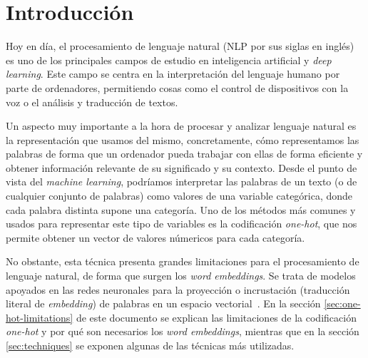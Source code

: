 \section{Introducción}

Hoy en día, el procesamiento de lenguaje natural (NLP por sus siglas en inglés)
es uno de los principales campos de estudio en inteligencia artificial y
\textit{deep learning}. Este campo se centra en la interpretación del lenguaje
humano por parte de ordenadores, permitiendo cosas como el control de
dispositivos con la voz o el análisis y traducción de textos.

Un aspecto muy importante a la hora de procesar y analizar lenguaje natural es
la representación que usamos del mismo, concretamente, cómo representamos las
palabras de forma que un ordenador pueda trabajar con ellas de forma eficiente y
obtener información relevante de su significado y su contexto. Desde el punto de
vista del \textit{machine learning}, podríamos interpretar las palabras de un
texto (o de cualquier conjunto de palabras) como valores de una variable
categórica, donde cada palabra distinta supone una categoría. Uno de los métodos
más comunes y usados para representar este tipo de variables es la codificación
\textit{one-hot}, que nos permite obtener un vector de valores númericos para
cada categoría.

No obstante, esta técnica presenta grandes limitaciones para el procesamiento de
lenguaje natural, de forma que surgen los \textit{word embeddings}. Se trata de
modelos apoyados en las redes neuronales para la proyección o incrustación
(traducción literal de \textit{embedding}) de palabras en un espacio
vectorial~\cite{definition}. En la sección \ref{sec:one-hot-limitations} de este
documento se explican las limitaciones de la codificación \textit{one-hot} y
por qué son necesarios los \textit{word embeddings}, mientras que en la sección
\ref{sec:techniques} se exponen algunas de las técnicas más utilizadas.
